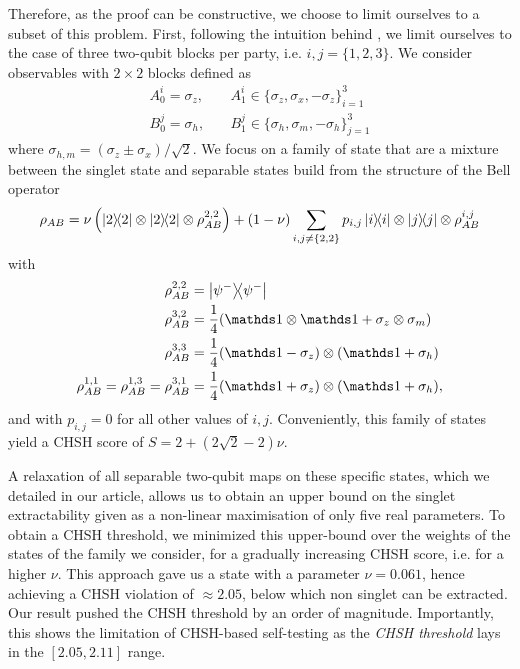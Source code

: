 Therefore, as the proof can be constructive, we choose to limit ourselves to a subset of this problem.
First, following the intuition behind \cite{Coopmans19}, we limit ourselves to the case of three two-qubit blocks per party, i.e. $i,j=\{1,2,3\}$.
We consider observables with $2 \times 2$ blocks defined as 
\begin{equation}
	\begin{split}
		A_0^i = \sigma_z, &\quad A_1^i \in \{\sigma_z,\sigma_x,-\sigma_z\}_{i=1}^3  \\
		B_0^j = \sigma_h, &\quad B_1^j \in \{\sigma_h,\sigma_m,-\sigma_h\}_{j=1}^3 
	\end{split}
\end{equation}
where $\sigma_{h,m} = (\sigma_z\pm\sigma_x)/\sqrt{2}$.
We focus on a family of state that are a mixture between the singlet state and separable states build from the structure of the Bell operator
\begin{equation}
	\rho_{AB} = \nu \left(\ketbra{2} \otimes \ketbra{2} \otimes \rho_{AB}^{2,2}\right) 
	+ (1-\nu) \sum_{i,j \neq \{2,2\}} p_{i,j} \ketbra{i} \otimes \ketbra{j} \otimes \rho_{AB}^{i,j}
\end{equation}
with 
\begin{equation}
	\begin{split}
    \rho_{AB}^{2,2}&=\ketbra{\psi^-} \\
    \rho_{AB}^{3,2}&= \frac{1}{4}(\id\otimes \id +\sigma_z\otimes \sigma_m)\\
    \rho_{AB}^{3,3}&= \frac{1}{4}(\id-\sigma_z)\otimes(\id+\sigma_h)\\
    \rho_{AB}^{1,1}=\rho_{AB}^{1,3}=\rho_{AB}^{3,1} &= \frac{1}{4}(\id+\sigma_z)\otimes(\id+\sigma_h),
	\end{split}	
\end{equation}
and with $p_{i,j} =0$ for all other values of $i,j$.
Conveniently, this family of states yield a CHSH score of $S=2+(2\sqrt{2}-2)\nu$.

A relaxation of all separable two-qubit maps on these specific states, which we detailed in our article, allows us to obtain an upper bound on the singlet extractability given as a non-linear maximisation of only five real parameters.
To obtain a CHSH threshold, we minimized this upper-bound over the weights of the states of the family we consider, for a gradually increasing CHSH score, i.e. for a higher $\nu$.
This approach gave us a state with a parameter $\nu=0.061$, hence achieving a CHSH violation of $\approx 2.05$, below which non singlet can be extracted.
Our result pushed the CHSH threshold by an order of magnitude.
Importantly, this shows the limitation of CHSH-based self-testing as the \textit{CHSH threshold} lays in the $[2.05,2.11]$ range.


